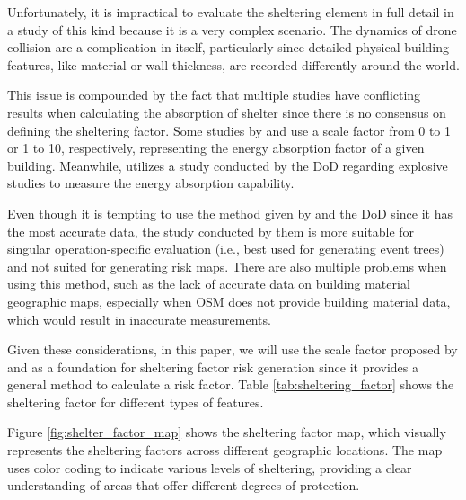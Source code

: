 \documentclass[12pt]{report}
\begin{document}
                Unfortunately, it is impractical to evaluate the sheltering element in full detail in a study of this
                kind because it is a very complex scenario. The dynamics of drone collision are a complication in
                itself, particularly since detailed physical building features, like material or wall thickness, are
                recorded differently around the world.
                        
                This issue is compounded by the fact that multiple studies have conflicting results when calculating the
                absorption of shelter since there is no consensus on defining the sheltering factor. Some studies by
                \cite{dalamagkidis_evaluating_2008} and \cite{primatesta_ground_2020} use a scale factor from 0 to 1 or
                1 to 10, respectively, representing the energy absorption factor of a given building. Meanwhile,
                \cite{melnyk_third-party_2014} utilizes a study conducted by the \ac{DoD} \cite{harwick_approved_2007}
                regarding explosive studies to measure the energy absorption capability.
                        
                Even though it is tempting to use the method given by \cite{melnyk_third-party_2014} and the DoD since
                it has the most accurate data, the study conducted by them is more suitable for singular
                operation-specific evaluation (i.e., best used for generating event trees) and not suited for generating
                risk maps. There are also multiple problems when using this method, such as the lack of accurate data on
                building material geographic maps, especially when OSM does not provide building material data, which
                would result in inaccurate measurements.
                        
                Given these considerations, in this paper, we will use the scale factor proposed by
                \cite{klepeis_national_2001} and \cite{primatesta_ground_2020} as a foundation for sheltering factor
                risk generation since it provides a general method to calculate a risk factor. Table
                \ref{tab:sheltering_factor} shows the sheltering factor for different types of features.
                        
                Figure \ref{fig:shelter_factor_map} shows the sheltering factor map, which visually represents the
                sheltering factors across different geographic locations. The map uses color coding to indicate various
                levels of sheltering, providing a clear understanding of areas that offer different degrees of
                protection.
                     
\end{document}
